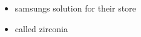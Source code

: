 \begin{itemize}
    \item samsungs solution for their store
    \item called zirconia
\end{itemize}
